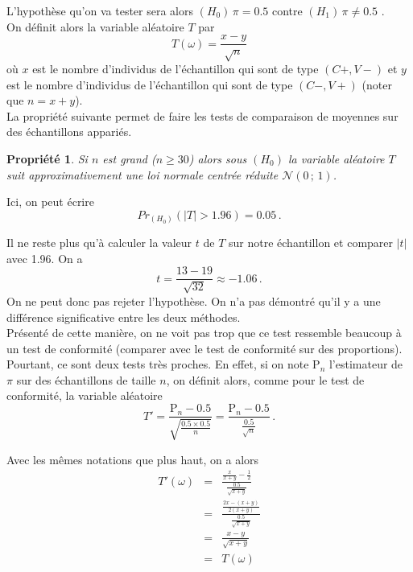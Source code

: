 \documentclass[12pt, a4paper]{book}
\newtheorem{prop}[thm]{Propriété}
\numberwithin{equation}{section}
\begin{document}
L'hypothèse qu'on va tester sera alors $(H_0) \, \pi=0.5$ contre $(H_1) \, \pi\neq 0.5$ .\\


On définit alors la variable aléatoire $T$ %
par 
$$
T(\omega) = \frac{x-y}{\sqrt{n}}
$$
où $x$ est le nombre d'individus de l'échantillon qui sont de type $(C+,V-)$ et $y$ est le nombre d'individus de l'échantillon qui sont de type $(C-,V+)$ (noter que $n=x+y$).\\

La propriété suivante permet de faire les tests de comparaison de moyennes sur des échantillons appariés.\\

\begin{prop} 
Si $n$ est grand ($n\geq 30$) alors sous $(H_0)$ la variable aléatoire $T$ suit approximativement une loi normale centrée réduite $\mathcal{N}(0\,;\,1)$.
\end{prop}

Ici, on peut écrire
$$
Pr_{(H_0)}(|T|>1.96)=0.05\,.
$$

Il ne reste plus qu'à calculer la valeur $t$ de $T$ sur notre échantillon et comparer $|t|$ avec 1.96. 
On a 
$$
t=\frac{13-19}{\sqrt{32}} \approx -1.06\,.
$$
On ne peut donc pas rejeter l'hypothèse. On n'a pas démontré qu'il y a une différence significative entre
les deux méthodes.\\

 Présenté de cette manière, on ne voit pas trop que ce test ressemble
beaucoup à un test de conformité (comparer avec le test de conformité sur des proportions). Pourtant,
ce sont deux tests très proches. En effet, si on note $\mathrm{P}_n$ l'estimateur de $\pi$ sur des 
échantillons de taille $n$, on définit alors, comme pour le test de conformité, la variable aléatoire
$$
T'=\frac{\mathrm{P}_n - 0.5}{\sqrt{\frac{0.5\times 0.5}{n}}} = 
\frac{\mathrm{P}_n - 0.5}{\frac{0.5}{\sqrt{n}}}\,.
$$

Avec les mêmes notations que plus haut, on a alors
\begin{eqnarray*}
T'(\omega) & = & \frac{\frac{x}{x+y} - \frac{1}{2}}{\frac{0.5}{\sqrt{x+y}}} \\
               & = & \frac{\frac{2x-(x+y)}{2(x+y)}}{\frac{0.5}{\sqrt{x+y}}} \\
               & = & \frac{x-y}{\sqrt{x+y}} \\
               & = & T(\omega) 
\end{eqnarray*}
\end{document}
